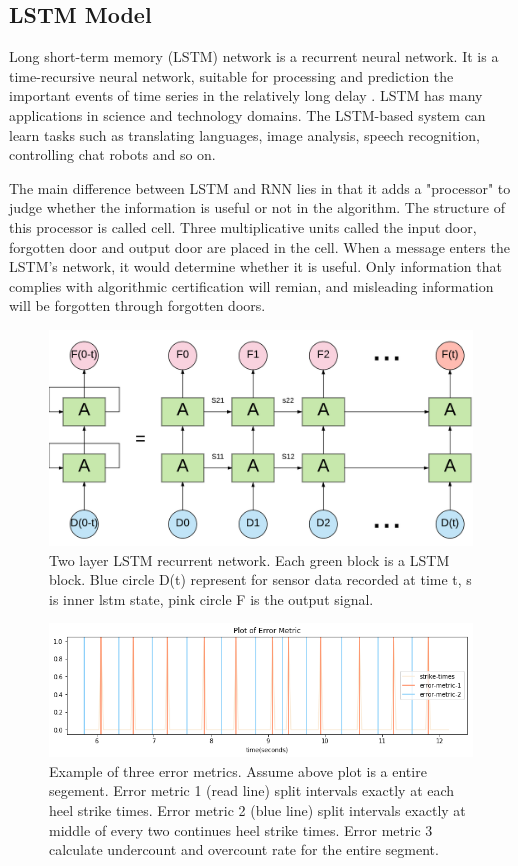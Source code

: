\documentclass[11pt]{article}
\begin{document}
{\subsection{LSTM Model}
Long short-term memory (LSTM) network is a recurrent neural network.
It is a time-recursive neural network, suitable for processing and prediction the important events of time series in the relatively long delay . LSTM has many applications in science and technology domains. The LSTM-based system can learn tasks such as translating languages, image analysis, speech recognition, controlling chat robots and so on.

The main difference between LSTM and RNN lies in that it adds a "processor" to judge whether the information is useful or not in the algorithm. The structure of this processor is called cell.
Three multiplicative units called the input door, forgotten door and output door are placed in the cell. When a message enters the LSTM's network, it would determine whether it is useful. Only information that complies with algorithmic certification will remian, and misleading information will be forgotten through forgotten doors.


\begin{figure}[ht]
\centering
\includegraphics[scale=0.3]{LSTM3}
\caption{Two layer LSTM recurrent network. Each green block is a LSTM block. Blue circle D(t) represent for sensor data recorded at time t, s is inner lstm state, pink circle F is the output signal.}
\label{fig:LSTM}
\end{figure}

\begin{figure}[ht]
\centering
\includegraphics[scale=0.6]{error_metric}
\caption{Example of three error metrics. Assume above plot is a entire segement. Error metric 1 (read line) split intervals exactly at each heel strike times. Error metric 2 (blue line) split intervals exactly at middle of every two continues heel strike times. Error metric 3 calculate undercount and overcount rate for the entire segment.}
\label{fig:error_metric}
\end{figure}

}
\end{document}
